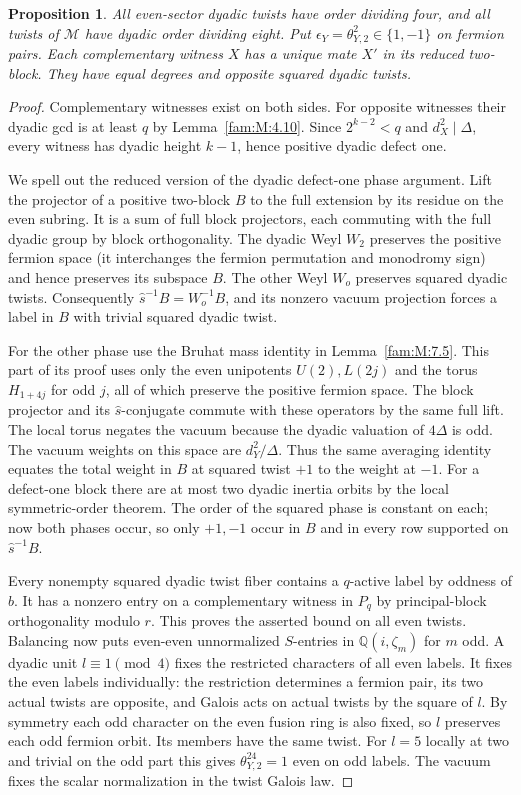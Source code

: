 \documentclass[11pt,a4paper]{article}
\numberwithin{equation}{section}
\newtheorem{proposition}[theorem]{Proposition}
\theoremstyle{remark}
\begin{document}
\begin{proposition}\label{fam:Q:7.1}
All even-sector dyadic twists have order dividing four, and all twists of
$\mathcal M$ have dyadic order dividing eight. Put
$\epsilon_Y=\theta_{Y,2}^2\in\{1,-1\}$ on fermion pairs.
Each complementary witness $X$ has a unique mate $X'$ in its reduced
two-block. They have equal degrees and opposite squared dyadic twists.
\end{proposition}
\begin{proof}
Complementary witnesses exist on both sides. For opposite witnesses
their dyadic gcd is at least $q$ by Lemma~\ref{fam:M:4.10}.
Since $2^{k-2}<q$ and $d_X^2\mid\Delta$, every witness has dyadic
height $k-1$, hence positive dyadic defect one.

We spell out the reduced version of the dyadic defect-one phase argument.
Lift the projector of a positive two-block $B$ to the full extension by its
residue on the even subring. It is a sum of full block projectors, each
commuting with the full dyadic group by block orthogonality. The dyadic
Weyl $W_2$ preserves the positive fermion space (it interchanges the
fermion permutation and monodromy sign) and hence preserves its subspace
$B$. The other Weyl $W_o$ preserves squared dyadic twists. Consequently
$\widehat s^{-1}B=W_o^{-1}B$, and its nonzero vacuum projection forces
a label in $B$ with trivial squared dyadic twist.

For the other phase use the Bruhat mass identity in Lemma~\ref{fam:M:7.5}. This part of its proof uses only the even unipotents
$U(2),L(2j)$ and the torus $H_{1+4j}$ for odd $j$, all of which
preserve the positive fermion space. The block projector and its
$\widehat s$-conjugate commute with these operators by the same full
lift. The local torus negates the vacuum because the dyadic valuation
of $4\Delta$ is odd. The vacuum weights on this space are
$d_Y^2/\Delta$. Thus the same averaging identity equates the total
weight in $B$ at squared twist $+1$ to the weight at $-1$.
For a defect-one block there are at most two dyadic inertia orbits by
the local symmetric-order theorem. The order of the squared phase is
constant on each; now both phases occur, so only $+1,-1$ occur in
$B$ and in every row supported on $\widehat s^{-1}B$.

Every nonempty squared dyadic twist fiber contains a $q$-active label
by oddness of $b$. It has a nonzero entry on a complementary witness
in $P_q$ by principal-block orthogonality modulo $r$. This proves
the asserted bound on all even twists. Balancing now puts even-even
unnormalized $S$-entries in $\mathbb Q(i,\zeta_m)$ for $m$ odd. A dyadic
unit $l\equiv1\pmod4$ fixes the restricted characters of all even labels.
It fixes the even labels individually: the restriction determines a
fermion pair, its two actual twists are opposite, and Galois acts on
actual twists by the square of $l$. By symmetry each odd character on
the even fusion ring is also fixed, so $l$ preserves each odd fermion
orbit. Its members have the same twist. For $l=5$ locally at two and
trivial on the odd part this gives $\theta_{Y,2}^{24}=1$ even on odd
labels. The vacuum fixes the scalar normalization in the twist Galois
law.


\end{proof}
\end{document}
